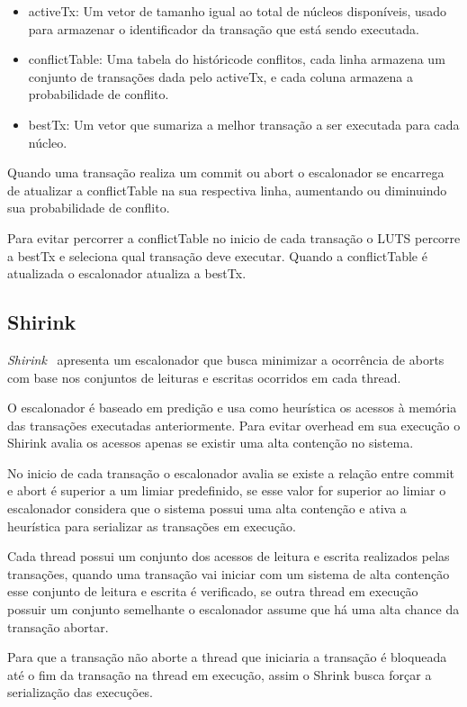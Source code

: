 \documentclass[diss,capa]{texufpel}
\begin{document}
\begin{itemize}
  \item  activeTx: Um vetor de tamanho igual ao total de núcleos disponíveis, usado para armazenar o identificador da transação que está sendo executada.
  \item conflictTable: Uma tabela do históricode conflitos, cada linha armazena um conjunto de transações dada pelo activeTx, e cada coluna armazena a probabilidade de conflito.
  \item bestTx: Um vetor que sumariza a melhor transação a ser executada para cada núcleo.
\end{itemize}

Quando uma transação realiza um commit ou abort o escalonador se encarrega de atualizar a conflictTable na sua respectiva linha, aumentando ou diminuindo sua probabilidade de conflito.

Para evitar percorrer a conflictTable no inicio de cada transação o LUTS percorre a bestTx e seleciona qual transação deve executar. Quando a conflictTable é atualizada o escalonador atualiza a bestTx.

\subsection{Shirink}

\emph{Shirink}~\cite{shirink2009} apresenta um escalonador que busca minimizar a ocorrência de aborts com base nos conjuntos de leituras e escritas ocorridos em cada thread.

O escalonador é baseado em predição e usa como heurística os acessos à memória das transações executadas anteriormente. Para evitar overhead em sua execução o Shirink avalia os acessos apenas se existir uma alta contenção no sistema.

No inicio de cada transação o escalonador avalia se existe a relação entre commit e abort é superior a um limiar predefinido, se esse valor for superior ao limiar o escalonador considera que o sistema possui uma alta contenção e ativa a heurística para serializar as transações em execução.

Cada thread possui um conjunto dos acessos de leitura e escrita realizados pelas transações, quando uma transação vai iniciar com um sistema de alta contenção esse conjunto de leitura e escrita é verificado, se outra thread em execução possuir um conjunto semelhante o escalonador assume que há uma alta chance da transação abortar.

Para que a transação não aborte a thread que iniciaria a transação é bloqueada até o fim da transação na thread em execução, assim o Shrink busca forçar a serialização das execuções.
\end{document}

